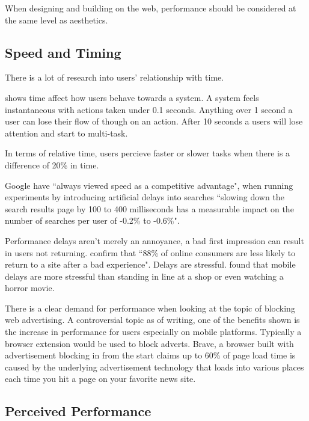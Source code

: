 When designing and building on the web, performance should be considered at the same level as aesthetics. \cite{performance_is_ux}

\subsection{Speed and Timing} \label{l-r--speed}

There is a lot of research into users' relationship with time.

\cite{usability_engineering} shows time affect how users behave towards a system. A system feels instantaneous with actions taken under 0.1 seconds. Anything over 1 second a user can lose their flow of though on an action. After 10 seconds a users will lose attention and start to multi-task.

In terms of relative time, users percieve faster or slower tasks when there is a difference of 20\% in time. \cite{setting_a_performance_budget}

Google have ``always viewed speed as a competitive advantage", when running experiments by introducing artificial delays into searches ``slowing down the search results page by 100 to 400 milliseconds has a measurable impact on the number of searches per user of -0.2\% to -0.6\%". \cite{speed_matters}

Performance delays aren't merely an annoyance, a bad first impression can result in users not returning. \cite{why_web_performance_matters} confirm that ``88\% of online consumers are less likely to return to a site after a bad experience". Delays are stressful. \cite{ericsson} found that mobile delays are more stressful than standing in line at a shop or even watching a horror movie.

There is a clear demand for performance when looking at the topic of blocking web advertising. A controversial topic as of writing, one of the benefits shown is the increase in performance for users especially on mobile platforms. Typically a browser extension would be used to block adverts. Brave, a browser built with advertisement blocking in from the start claims up to 60\% of page load time is caused by the underlying advertisement technology that loads into various places each time you hit a page on your favorite news site. \cite{brave}

\subsection{Perceived Performance} \label{l-r--perceived-performance}

